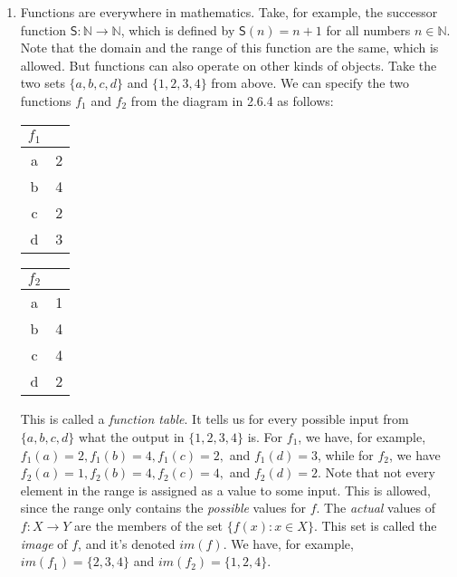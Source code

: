 \begin{enumerate}[\thesection.1]
\item Functions are everywhere in mathematics. Take, for example, the successor function $\mathsf{S}:\mathbb{N}\to \mathbb{N}$, which is defined by $\mathsf{S}(n)=n+1$ for all numbers $n\in\mathbb{N}$. Note that the domain and the range of this function are the same, which is allowed. But functions can also operate on other kinds of objects. Take the two sets $\{a,b,c,d\}$ and $\{1,2,3,4\}$ from above. We can specify the two functions $f_1$ and $f_2$ from the diagram in 2.6.4 as follows:
	\begin{center}
		\begin{tabular}{c | c}
		$f_1$ &  \\
		\hline
		a & 2\\
		b & 4\\
		c & 2\\
		d & 3
		\end{tabular}
		\hspace{8ex}
			\begin{tabular}{c | c}
		$f_2$ &  \\
		\hline
		a & 1\\
		b & 4\\
		c & 4\\
		d & 2
		\end{tabular}
	\end{center}
    This is called a \emph{function table}.
    It tells us for every possible input from $\{a,b,c,d\}$ what the output in $\{1,2,3,4\}$ is.
    For $f_{1}$, we have, for example,
    $f_{1}(a)=2, f_{1}(b)=4, f_{1}(c)=2,$ and $f_{1}(d)=3$,
    while for $f_{2}$, we have
    $f_{2}(a)=1, f_{2}(b)=4, f_{2}(c)=4,$ and $f_{2}(d)=2$.
    Note that not every element in the range is assigned as a value to some input.
    This is allowed,
    since the range only contains the \emph{possible} values for $f$.
    The \emph{actual} values of $f:X\to Y$ are the members of the set $\{f(x): x\in X\}$.
    This set is called the \emph{image} of $f$,
    and it's denoted $im(f)$.
    We have, for example,
    $im(f_1)=\{2,3,4\}$ and $im(f_2)=\{1,2,4\}$.


\end{enumerate}
